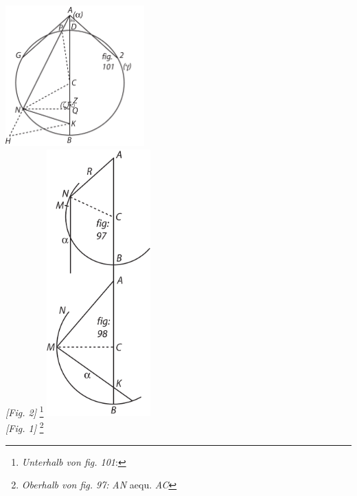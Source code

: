 \begin{center}
\includegraphics[width=0.4\textwidth]{images/T8_Barrow-2}
\\ \textit{[Fig. 2]} \footnote{\textit{Unterhalb von fig. 101}: }
\newpage
\includegraphics[width=0.3\textwidth]{images/T8_Barrow-1}
\\ \textit{[Fig. 1]} \footnote{\textit{Oberhalb von fig. 97:} \textit{AN} aequ. \textit{AC}}
\end{center}